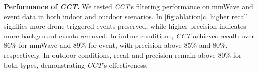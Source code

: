 \textbf{Performance of \textit{CCT}.}
We tested \textit{CCT}'s filtering performance on mmWave and event data in both indoor and outdoor scenarios. 
In \fig \ref{fig:ablation}c, higher recall signifies more drone-triggered events preserved, while higher precision indicates more background events removed. 
In indoor conditions, \textit{CCT} achieves recalls over 86\% for mmWave and 89\% for event, with precision above 85\% and 80\%, respectively. 
In outdoor conditions, recall and precision remain above 80\% for both types, demonstrating \textit{CCT}'s effectiveness.


